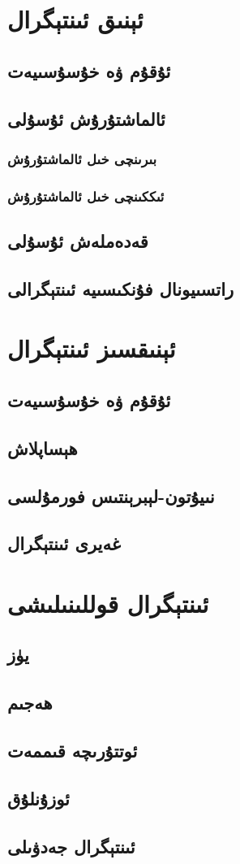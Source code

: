 
\section{ئېنىق ئىنتېگرال}
\subsection{ئۇقۇم ۋە خۇسۇسىيەت}
\subsection{ئالماشتۇرۇش ئۇسۇلى}
\subsubsection{بىرىنچى خىل ئالماشتۇرۇش}
\subsubsection{ئىككىنچى خىل ئالماشتۇرۇش}
\subsection{قەدەملەش ئۇسۇلى}
\subsection{راتسىيونال فۇنكىسىيە ئىنتېگرالى}

\section{ئېنىقسىز ئىنتېگرال}
\subsection{ئۇقۇم ۋە خۇسۇسىيەت}
\subsection{ھېساپلاش}
\subsection{نىيۇتون-لېبرېنتىس فورمۇلسى}
\subsection{غەيرى ئىنتېگرال}

\section{ئىنتېگرال قوللىنىلىشى}
\subsection{يۈز}
\subsection{ھەجىم}
\subsection{ئوتتۇرىچە قىممەت}
\subsection{ئوزۇنلۇق}

\subsection{ئىنتېگرال جەدۋىلى}